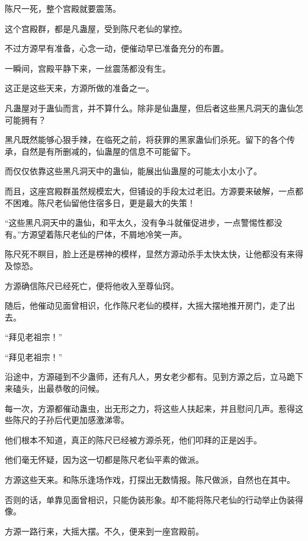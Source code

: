 
\begin{this_body}

陈尺一死，整个宫殿就要震荡。

这个宫殿群，都是凡蛊屋，受到陈尺老仙的掌控。

不过方源早有准备，心念一动，便催动早已准备充分的布置。

一瞬间，宫殿平静下来，一丝震荡都没有生。

这正是这些天来，方源所做的准备之一。

凡蛊屋对于蛊仙而言，并不算什么。除非是仙蛊屋，但后者这些黑凡洞天的蛊仙怎可能拥有？

黑凡既然能够心狠手辣，在临死之前，将获罪的黑家蛊仙们杀死。留下的各个传承，自然是有所删减的，仙蛊屋的信息不可能留下。

而仅仅依靠这些黑凡洞天中的蛊仙，能展出仙蛊屋的可能太小太小了。

而且，这座宫殿群虽然规模宏大，但铺设的手段太过老旧。方源要来破解，一点都不困难。陈尺老仙留他住宿多日，更是最大的失策！

“这些黑凡洞天中的蛊仙，和平太久，没有争斗就催促进步，一点警惕性都没有。”方源望着陈尺老仙的尸体，不屑地冷笑一声。

陈尺死不瞑目，脸上还是楞神的模样，显然方源动杀手太快太快，让他都没有来得及惊恐。

方源确信陈尺已经死亡，便将他收入至尊仙窍。

随后，他催动见面曾相识，化作陈尺老仙的模样，大摇大摆地推开房门，走了出去。

“拜见老祖宗！”

“拜见老祖宗！”

沿途中，方源碰到不少蛊师，还有凡人，男女老少都有。见到方源之后，立马跪下来磕头，出最恭敬的问候。

每一次，方源都催动蛊虫，出无形之力，将这些人扶起来，并且慰问几声。惹得这些陈尺的子孙后代更加感激涕零。

他们根本不知道，真正的陈尺已经被方源杀死，他们叩拜的正是凶手。

他们毫无怀疑，因为这一切都是陈尺老仙平素的做派。

方源这些天来。和陈乐逢场作戏，打探出无数情报。陈尺做派，自然也在其中。

否则的话，单靠见面曾相识，只能伪装形象。却不能将陈尺老仙的行动举止伪装得像。

方源一路行来，大摇大摆。不久，便来到一座宫殿前。


\end{this_body}
